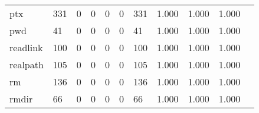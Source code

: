 \begin{longtable}{lp{1.20cm}p{1.20cm}p{1.20cm}p{1.20cm}p{1.20cm}p{1.20cm}p{1.20cm}p{1.20cm}p{1.20cm}p{1.20cm}}
ptx       &                                   331 &                                                  0 &                                                  0 &                                                  0 &                                                  0 &                                                331 &                                         1.000 &                                              1.000 &                                              1.000 \\
pwd       &                                    41 &                                                  0 &                                                  0 &                                                  0 &                                                  0 &                                                 41 &                                         1.000 &                                              1.000 &                                              1.000 \\
readlink  &                                   100 &                                                  0 &                                                  0 &                                                  0 &                                                  0 &                                                100 &                                         1.000 &                                              1.000 &                                              1.000 \\
realpath  &                                   105 &                                                  0 &                                                  0 &                                                  0 &                                                  0 &                                                105 &                                         1.000 &                                              1.000 &                                              1.000 \\
rm        &                                   136 &                                                  0 &                                                  0 &                                                  0 &                                                  0 &                                                136 &                                         1.000 &                                              1.000 &                                              1.000 \\
rmdir     &                                    66 &                                                  0 &                                                  0 &                                                  0 &                                                  0 &                                                 66 &                                         1.000 &                                              1.000 &                                              1.000 \\

\end{longtable}
